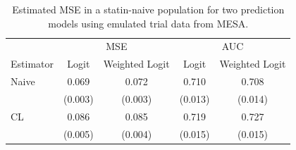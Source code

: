\begin{table}[t]
    \centering
    \caption{Estimated MSE in a statin-naive population for two prediction models using emulated trial data from MESA.}
    \begin{threeparttable}
        \begin{tabular}{lcccc}
        \toprule
        \multicolumn{1}{c}{ } & \multicolumn{2}{c}{MSE} & \multicolumn{2}{c}{AUC} \\
        \cmidrule(l{3pt}r{3pt}){2-3} \cmidrule(l{3pt}r{3pt}){4-5}
        Estimator & Logit & Weighted Logit & Logit & Weighted Logit\\
        \midrule
        Naive & 0.069 & 0.072 & 0.710 & 0.708\\
         & (0.003) & (0.003) & (0.013) & (0.014)\\
        CL & 0.086 & 0.085 & 0.719 & 0.727\\
         & (0.005) & (0.004) & (0.015) & (0.015)\\

\end{tabular}
\end{threeparttable}
\end{table}
